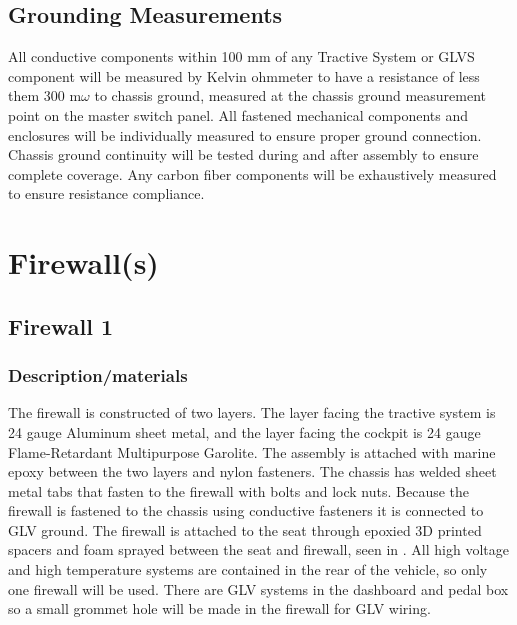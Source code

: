 \documentclass{article}
\begin{document}
\subsection{Grounding Measurements}
All conductive components within 100 mm of any Tractive System or GLVS component will be measured by Kelvin ohmmeter to have a resistance of less them 300 m$\omega$ to chassis ground, measured at the chassis ground measurement point on the master switch panel. All fastened mechanical components and enclosures will be individually measured to ensure proper ground connection. Chassis ground continuity will be tested during and after assembly to ensure complete coverage. Any carbon fiber components will be exhaustively measured to ensure resistance compliance.

\section{Firewall(s)}\label{firewalls}
\subsection{Firewall 1}\label{firewall_1}
\subsubsection{Description/materials}
The firewall is constructed of two layers. The layer facing the tractive system is 24 gauge Aluminum sheet metal, and the layer facing the cockpit is 24 gauge Flame-Retardant Multipurpose Garolite. The assembly is attached with marine epoxy between the two layers and nylon fasteners. The chassis has welded sheet metal tabs that fasten to the firewall with bolts and lock nuts. Because the firewall is fastened to the chassis using conductive fasteners it is connected to GLV ground. The firewall is attached to the seat through epoxied 3D printed spacers and foam sprayed between the seat and firewall, seen in .
All high voltage and high temperature systems are contained in the rear of the vehicle, so only one firewall will be used. There are GLV systems in the dashboard and pedal box so a small grommet hole will be made in the firewall for GLV wiring.
\end{document}
